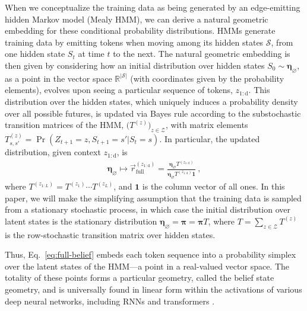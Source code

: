 \documentclass{article}
\theoremstyle{plain}
\theoremstyle{definition}
\theoremstyle{remark}
\newcommand{\stationary}{\boldsymbol{\pi}}
\newcommand{\SSet}{\mathcal{S}}
\begin{document}
When we conceptualize
the training data as being generated by an edge-emitting hidden Markov model (Mealy HMM), we can derive a natural geometric embedding for these conditional probability distributions. HMMs generate training data by emitting tokens when moving 
among its hidden states $\SSet$,
from one hidden state $S_t$ at time $t$ to the next. The natural geometric embedding is then given by considering how an 
%
initial distribution over hidden states 
$S_0 \sim \boldsymbol{\eta}_\varnothing$,
as a point in the vector space $\mathbb{R}^{|\SSet|}$ (with coordinates given by the probability elements),
evolves upon seeing a particular sequence of tokens, $z_{1:\text{d}}$.
This distribution over the hidden states, which uniquely induces a probability density over all possible futures,
is updated via Bayes rule
according to the substochastic transition matrices of the HMM, $\bigl( T^{(z)} \bigr)_{z \in \mathcal{Z}}$,
with matrix elements
$T^{(z)}_{s,s'} = \Pr(Z_{t+1} = z, S_{t+1} = s' | S_t = s)$.
In particular, the updated distribution, given context $z_{1:\text{d}}$, is
\begin{align}
    \boldsymbol{\eta}_\varnothing
    \mapsto
    \vec{r}_\text{full}^{(z_{1:\text{d}})} = \frac{\boldsymbol{\eta}_\varnothing T^{(z_{1:\text{d}})}}{\boldsymbol{\eta}_\varnothing T^{(z_{1:\text{d}})} \boldsymbol{1}}
~,
    \label{eq:full-belief}
\end{align}
where $T^{(z_{1:L})} = T^{(z_1)} \cdots T^{(z_L)}$,
and $\boldsymbol{1}$
is the column vector of all ones.
In this paper, we will make the simplifying assumption that the training data is sampled from a stationary stochastic process,
in which case the initial distribution over latent states
is the stationary distribution 
$\boldsymbol{\eta}_\varnothing = 
\stationary = \stationary T$,
where $T = \sum_{z \in \mathcal{Z}} T^{(z)}$ is the 
row-stochastic transition matrix over hidden states.



Thus, %
Eq.~\eqref{eq:full-belief}
embeds each token sequence into a probability simplex over the latent states of the HMM---a point in a real-valued vector space. The totality of these points forms a particular geometry, called the belief state geometry, and is universally found in linear form within the activations of various deep neural networks, including RNNs \citep{Pepper24_RNNs} and transformers \citep{shai2024transformersrepresentbeliefstate}. 
\end{document}
